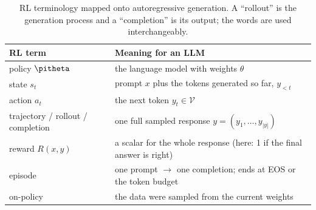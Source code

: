 \begin{table}[ht]
\centering\small
\begin{tabularx}{\linewidth}{@{}lX@{}}
\toprule
RL term & Meaning for an LLM\\
\midrule
policy $\pitheta$ & the language model with weights $\theta$\\
state $s_t$ & prompt $x$ plus the tokens generated so far, $y_{<t}$\\
action $a_t$ & the next token $y_t\in\mathcal{V}$\\
trajectory / rollout / completion & one full sampled response $y=(y_1,\dots,y_{|y|})$\\
reward $R(x,y)$ & a scalar for the whole response (here: 1 if the final answer is right)\\
episode & one prompt $\to$ one completion; ends at EOS or the token budget\\
on-policy & the data were sampled from the current weights\\
\bottomrule
\end{tabularx}
\caption{RL terminology mapped onto autoregressive generation. A ``rollout'' is the
generation process and a ``completion'' is its output; the words are used interchangeably.}
\label{tab:grpo:vocab}
\end{table}

